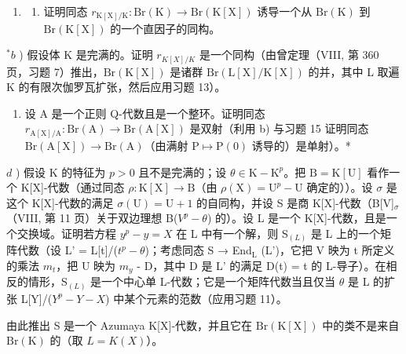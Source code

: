 \begin{enumerate}
\def\labelenumi{\arabic{enumi})}
\setcounter{enumi}{15}
\tightlist
\item
  \begin{enumerate}
  \def\labelenumii{\alph{enumii})}
  \tightlist
  \item
    证明同态 \(r_{\mathrm{K[X]}/\mathrm{K}} : \mathrm{Br}(\mathrm{K}) \to \mathrm{Br}(\mathrm{K}[\mathrm{X}])\) 诱导一个从 \(\mathrm{Br}(\mathrm{K})\) 到 \(\mathrm{Br}(\mathrm{K}[\mathrm{X}])\) 的一个直因子的同构。
  \end{enumerate}
\end{enumerate}

\(^{*}b\) ) 假设体 K 是完满的。证明 \(r_{K[X]/K}\) 是一个同构（由曾定理（VIII, 第 360 页，习题 7）推出，\(\mathrm{Br}(\mathrm{K}[\mathrm{X}])\) 是诸群 \(\mathrm{Br}(\mathrm{L}[\mathrm{X}]/\mathrm{K}[\mathrm{X}])\) 的并，其中 L 取遍 K 的有限次伽罗瓦扩张，然后应用习题 13）。

\begin{enumerate}
\def\labelenumi{\alph{enumi})}
\setcounter{enumi}{2}
\tightlist
\item
  设 A 是一个正则 Q-代数且是一个整环。证明同态 \(r_{\mathrm{A[X]}/\mathrm{A}} : \mathrm{Br}(\mathrm{A}) \to \mathrm{Br}(\mathrm{A}[\mathrm{X}])\) 是双射（利用 b) 与习题 15 证明同态 \(\mathrm{Br}(\mathrm{A}[\mathrm{X}]) \to \mathrm{Br}(\mathrm{A})\)（由满射 \(\mathrm{P} \mapsto \mathrm{P}(0)\) 诱导的）是单射）。*
\end{enumerate}

\(d\) ) 假设 K 的特征为 \(p > 0\) 且不是完满的；设 \(\theta \in \mathrm{K} - \mathrm{K}^p\)。把 \(\mathrm{B} = \mathrm{K}[\mathrm{U}]\) 看作一个 K{[}X{]}-代数（通过同态 \(\rho : \mathrm{K}[\mathrm{X}] \to \mathrm{B}\)（由 \(\rho (\mathrm{X}) = \mathrm{U}^p - \mathrm{U}\) 确定的））。设 \(\sigma\) 是这个 K{[}X{]}-代数的满足 \(\sigma (\mathrm{U}) = \mathrm{U} + 1\) 的自同构，并设 S 是商 K{[}X{]}-代数（B{[}V{]}\(_{\sigma}\)（VIII, 第 11 页）关于双边理想 B(\(V^{p} - \theta\)) 的）。设 L 是一个 K{[}X{]}-代数，且是一个交换域。证明若方程 \(y^p - y = X\) 在 L 中有一个解，则 S\(_{(L)}\) 是 L 上的一个矩阵代数（设 L' = L{[}t{]}/(\(t^{p} - \theta\))；考虑同态 S → End\(_{\mathrm{L}}\) (L')，它把 V 映为 t 所定义的乘法 \(m_t\)，把 U 映为 \(m_y\) - D，其中 D 是 L' 的满足 D(t) = t 的 L-导子）。在相反的情形，S\(_{(L)}\) 是一个中心单 L-代数；它是一个矩阵代数当且仅当 \(\theta\) 是 L 的扩张 L{[}Y{]}/(\(Y^{p} - Y - X\)) 中某个元素的范数（应用习题 11）。

由此推出 S 是一个 Azumaya K{[}X{]}-代数，并且它在 \(\mathrm{Br}(\mathrm{K}[\mathrm{X}])\) 中的类不是来自 \(\mathrm{Br}(\mathrm{K})\) 的（取 \(L = K(X)\)）。

